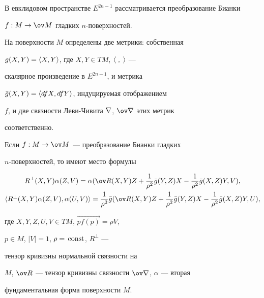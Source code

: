  


 




 


\maketitle 


 




 


В евклидовом пространстве $E^{2n-1}$ рассматривается преобразование Бианки 


$f:M\to{\ov M}$ гладких $n$-поверхностей. 


 


На поверхности $M$ определены две метрики: собственная 


$g(X,Y)=\langle X,Y\rangle$, где $X,Y\in TM$, $\langle\;,\;\rangle$ --- 


скалярное произведение в $E^{2n-1}$, и метрика 


$\Bar g(X,Y)=\langle dfX,dfY\rangle$, индуцируемая отображением 


$f$, и две связности Леви-Чивита $\nabla$, $\ov\na$ этих метрик 


соответственно. 


 


\begin{thmnonum} Если $f:M\to{\ov M}$ --- преобразование Бианки гладких 


$n$-поверхностей, то имеют место формулы 


\begin{gather} 


R^\bot(X,Y)\alpha(Z,V)=\alpha(\ov R(X,Y)Z+\frac{1}{\rho^2} 


\Bar g(Y,Z)X-\frac{1}{\rho^2}\Bar g(X,Z)Y,V),\\ 


\la R^\bot(X,Y)\alpha(Z,V),\alpha(U,V)\ra= 


\frac{1}{\rho^2}\Bar g(\ov R(X,Y)Z+\frac{1}{\rho^2}\Bar g 


(Y,Z)X-\frac{1}{\rho^2}\Bar g(X,Z)Y,U), 


\end{gather} 


где $X,Y,Z,U,V\in TM$, $\overrightarrow{pf(p)}=\rho V$, 


$p\in M$, $|V|=1$, $\rho=\text{\,const}$, $R^\bot$ --- 


тензор кривизны нормальной связности на 


$M$, $\ov R$ --- тензор кривизны связности $\ov\na$, $\alpha$ --- вторая 


фундаментальная форма поверхности $M$. 


\end{thmnonum} 


